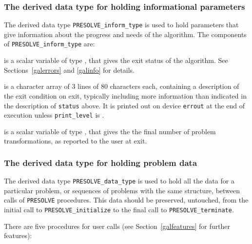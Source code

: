 \documentclass{galahad}
\newcommand{\packagename}{PRESOLVE}
\newcommand{\sym}{\tt\small}
\begin{document}

\subsubsection{The derived data type for holding informational
 parameters}\label{typeinform}
The derived data type
{\tt \packagename\_inform\_type}
is used to hold parameters that give information about the progress and needs
of the algorithm. The components of
{\tt \packagename\_inform\_type}
are:

\begin{description}

 is a scalar variable of type \integer, that gives the
exit status of the algorithm. See Sections~\ref{galerrors} and \ref{galinfo}
for details.

 is a character array of 3 lines of 80 characters each,
containing a description of the exit condition
on exit, typically including more information
than indicated in the description of {\tt status} above.
It is printed out on device {\tt errout} at the end of execution
unless {\tt print\_level} is {\sym \galsymsilent}.

 is a scalar variable of type \integer, that
gives the the final number of problem transformations, as reported
to the user at exit.
\end{description}


\subsubsection{The derived data type for holding problem data}\label{typedata}
The derived data type
{\tt \packagename\_data\_type}
is used to hold all the data for a particular problem,
or sequences of problems with the same structure, between calls of
{\tt \packagename} procedures.
This data should be preserved, untouched, from the initial call to
{\tt \packagename\_initialize}
to the final call to
{\tt \packagename\_terminate}.


\galarguments
There are five procedures for user calls
(see Section~\ref{galfeatures} for further features):
\end{document}
